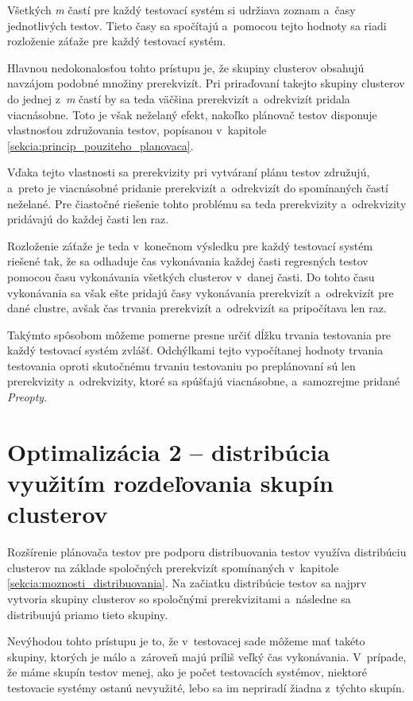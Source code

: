 Všetkých \textit{m} častí pre každý testovací systém si udržiava
zoznam a~časy jednotlivých testov. Tieto časy sa spočítajú a~pomocou
tejto hodnoty sa riadi rozloženie záťaže pre každý testovací systém.

Hlavnou nedokonalosťou tohto prístupu je, že skupiny clusterov obsahujú 
navzájom podobné množiny prerekvizít. Pri priraďovaní takejto skupiny clusterov
do jednej z~\textit{m} častí by sa teda väčšina prerekvizít a~odrekvizít
pridala viacnásobne. Toto je však neželaný efekt, nakoľko plánovač testov
disponuje vlastnosťou združovania testov, popísanou v~kapitole 
\ref{sekcia:princip_pouziteho_planovaca}.

Vďaka tejto vlastnosti sa prerekvizity pri vytváraní plánu testov 
združujú, a~preto je viacnásobné pridanie prerekvizít a~odrekvizít do 
spomínaných častí neželané.
Pre čiastočné riešenie tohto problému sa teda prerekvizity a~odrekvizity
pridávajú do každej časti len raz. 

Rozloženie záťaže je teda v~konečnom výsledku pre každý testovací systém 
riešené tak, že sa odhaduje čas vykonávania každej časti regresných testov
pomocou času vykonávania všetkých clusterov v~danej časti. 
Do tohto času vykonávania sa však ešte pridajú časy vykonávania 
prerekvizít a~odrekvizít pre dané clustre, avšak čas trvania 
prerekvizít a~odrekvizít sa pripočítava len raz.

Takýmto spôsobom môžeme pomerne presne určiť dĺžku trvania testovania
pre každý testovací systém zvlášť. Odchýlkami tejto vypočítanej hodnoty
trvania testovania oproti skutočnému trvaniu testovaniu po preplánovaní 
sú len prerekvizity a~odrekvizity, ktoré sa spúšťajú viacnásobne, 
a~samozrejme pridané \textit{Preopty}. 


\section{Optimalizácia 2 -- distribúcia využitím rozdeľovania skupín clusterov}
\label{sekcia:optimalizacia2}
Rozšírenie plánovača testov pre podporu distribuovania testov využíva 
distribúciu clusterov na základe spoločných prerekvizít spomínaných 
v~kapitole  \ref{sekcia:moznosti_distribuovania}.
Na začiatku distribúcie testov sa najprv vytvoria skupiny clusterov so 
spoločnými prerekvizitami a~následne sa distribuujú priamo tieto skupiny. 

Nevýhodou tohto prístupu je to, že v~testovacej sade môžeme mať takéto 
skupiny, ktorých je málo a~zároveň majú príliš veľký čas vykonávania. 
V~prípade, že máme skupín testov menej, ako je počet testovacích systémov, 
niektoré testovacie systémy ostanú nevyužité, lebo sa im nepriradí 
žiadna z~týchto skupín.


